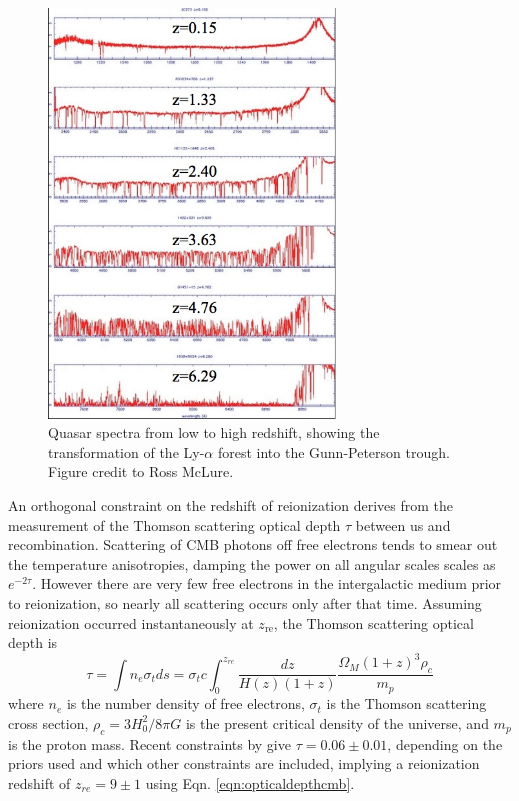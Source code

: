 \begin{figure}
	\centering
	\includegraphics[width=3in]{chap0_intro/lymanalpha_diffz.jpg}
	\caption[Quasar spectra from low to high redshift, showing the transformation of the Ly-$\alpha$ forest into the Gunn-Peterson trough.]{Quasar spectra from low to high redshift, showing the transformation of the Ly-$\alpha$ forest into the Gunn-Peterson trough. Figure credit to Ross McLure.}
	\label{fig:lya}
\end{figure}

An orthogonal constraint on the redshift of reionization derives from the measurement of the Thomson scattering optical depth $\tau$ between us and recombination. Scattering of CMB photons off free electrons tends to smear out the temperature anisotropies, damping the power on all angular scales scales as $e^{-2\tau}$. However there are very few free electrons in the intergalactic medium prior to reionization, so nearly all scattering occurs only after that time.  Assuming reionization occurred instantaneously at $z_\text{re}$, the Thomson scattering optical depth is 
\begin{equation}
\label{eqn:opticaldepthcmb}
	\tau=\int n_e\sigma_t ds=\sigma_t c\int_0^{z_{re}}\frac{dz}{H(z)(1+z)}\frac{\Omega_M(1+z)^3\rho_c}{m_p}
\end{equation}
where $n_e$ is the number density of free electrons, $\sigma_t$ is the Thomson scattering cross section, $\rho_c=3H_0^2/8\pi G$ is the present critical density of the universe, and $m_p$ is the proton mass. Recent constraints by \citep{plancktau16} give  $\tau=0.06\pm0.01$, depending on the priors used and which other constraints are included, implying a reionization redshift of $z_{re}=9\pm1$ using Eqn. \ref{eqn:opticaldepthcmb}.

